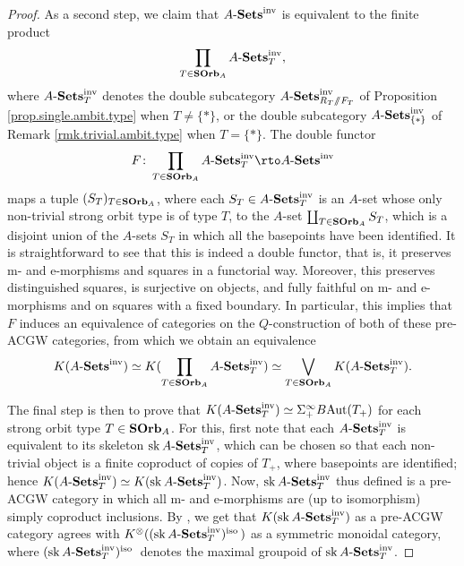 \documentclass[11pt]{amsart}
\renewcommand{\ss}{\mathord{\sslash}}
\begin{document}
\begin{proof}
As a second step, we claim that $A\text{-}\mathbf{Sets}^{\mathrm{inv}}$ is equivalent to the finite product $$\prod_{T\in\mathbf{SOrb}_A} A\text{-}\mathbf{Sets}^{\mathrm{inv}}_{T},$$ where $A\text{-}\mathbf{Sets}^{\mathrm{inv}}_T$ denotes the double subcategory $\ASets^\inv_{R_T\ss F_T}$ of Proposition \ref{prop.single.ambit.type} when $T\neq \{*\}$, or the double subcategory $A\text{-}\mathbf{Sets}^{\mathrm{inv}}_{\{*\}}$ of Remark \ref{rmk.trivial.ambit.type} when $T=\{*\}$. The double functor \[F\colon \prod_{T\in\Amb_A} \ASets^\inv_{T}\to \ASets^\inv\] maps a tuple $(S_T)_{T\in\mathbf{SOrb}_A}$, where each $S_T\in A\text{-}\mathbf{Sets}^{\mathrm{inv}}_T$ is an $A$-set whose only non-trivial strong orbit type is of type $T$, to the $A$-set $\coprod_{T\in\mathbf{SOrb}_A} S_T$, which is a disjoint union of the $A$-sets $S_T$ in which all the basepoints have been identified. It is straightforward to see that this is indeed a double functor, that is, it preserves m- and e-morphisms and squares in a functorial way. Moreover, this preserves distinguished squares, is surjective on objects, and fully faithful on m- and e-morphisms and on squares with a fixed boundary. In particular, this implies that $F$ induces an equivalence of categories on the $Q$-construction of both of these pre-ACGW categories, from which we obtain an equivalence 
\[K(A\text{-}\mathbf{Sets}^{\mathrm{inv}})\simeq K(\prod_{T\in\mathbf{SOrb}_A} A\text{-}\mathbf{Sets}^{\mathrm{inv}}_{T})\simeq \bigvee_{T\in\mathbf{SOrb}_A} K(A\text{-}\mathbf{Sets}^{\mathrm{inv}}_{T}).\]


The final step is then to prove that $K(A\text{-}\mathbf{Sets}^{\mathrm{inv}}_T)\simeq \Sigma_+^\infty B\mathrm{Aut}(T_+)$ for each strong orbit type $T\in\mathbf{SOrb}_A$.  For this, first note that each $A\text{-}\mathbf{Sets}^{\mathrm{inv}}_T$ is equivalent to its skeleton $\operatorname{sk}A\text{-}\mathbf{Sets}^{\mathrm{inv}}_T$, which can be chosen so that each non-trivial object is a finite coproduct of copies of $T_+$, where basepoints are identified; hence $K(A\text{-}\mathbf{Sets}^{\mathrm{inv}}_T)\simeq K(\operatorname{sk}A\text{-}\mathbf{Sets}^{\mathrm{inv}}_T)$. Now, $\operatorname{sk}A\text{-}\mathbf{Sets}^{\mathrm{inv}}_T$ thus defined is a pre-ACGW category in which all m- and e-morphisms are (up to isomorphism) simply coproduct inclusions. By \cite[Propositions 5.9 and 5.12]{SS-cgw}, we get that $K(\operatorname{sk}A\text{-}\mathbf{Sets}^{\mathrm{inv}}_T)$ as a pre-ACGW category agrees with $K^\otimes ((\operatorname{sk}A\text{-}\mathbf{Sets}^{\mathrm{inv}}_T)^\mathrm{iso}\,)$ as a symmetric monoidal category, where  $(\operatorname{sk}A\text{-}\mathbf{Sets}^{\mathrm{inv}}_T)^\mathrm{iso}\,$ denotes the maximal groupoid of $\operatorname{sk}A\text{-}\mathbf{Sets}^{\mathrm{inv}}_T$.


\end{proof}
\end{document}
